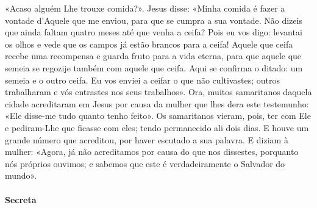 \begin{paracol}{2}
{«Acaso alguém Lhe trouxe comida?». Jesus disse: «Minha comida é fazer a vontade d’Aquele que me enviou, para que se cumpra a sua vontade. Não dizeis que ainda faltam quatro meses até que venha a ceifa? Pois eu vos digo: levantai os olhos e vede que os campos já estão brancos para a ceifa! Aquele que ceifa recebe uma recompensa e guarda fruto para a vida eterna, para que aquele que semeia se regozije também com aquele que ceifa. Aqui se confirma o ditado: um semeia e o outro ceifa. Eu vos enviei a ceifar o que não cultivastes; outros trabalharam e vós entrastes nos seus trabalhos». Ora, muitos samaritanos daquela cidade acreditaram em Jesus por causa da mulher que lhes dera este testemunho: «Ele disse-me tudo quanto tenho feito». Os samaritanos vieram, pois, ter com Ele e pediram-Lhe que ficasse com eles; tendo permanecido ali dois dias. E houve um grande número que acreditou, por haver escutado a sua palavra. E diziam à mulher: «Agora, já não acreditamos por causa do que nos dissestes, porquanto nós próprios ouvimos; e sabemos que este é verdadeiramente o Salvador do mundo».
}\end{paracol}

\begin{paracol}{2}\switchcolumn{}\end{paracol}

\paragraph{Secreta}
\begin{paracol}{2}\switchcolumn{}\end{paracol}

\begin{paracol}{2}\switchcolumn{}\end{paracol}

